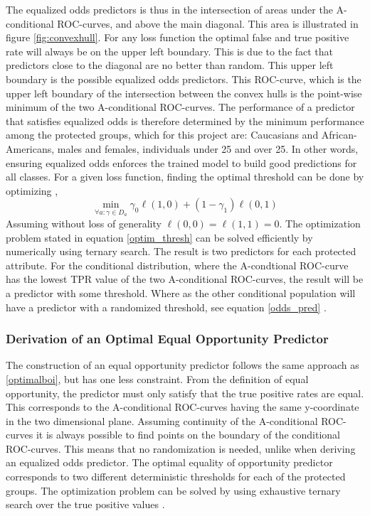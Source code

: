 \documentclass[11pt, fleqn, titlepage]{article}
\begin{document}
	The equalized odds predictors is thus in the intersection of areas under the A-conditional ROC-curves, and above the main diagonal. This area is illustrated in figure \ref{fig:convexhull}. For any loss function the optimal false and true positive rate will always be on the upper left boundary. This is due to the fact that predictors close to the diagonal are no better than random. This upper left boundary is the possible equalized odds predictors. This ROC-curve, which is the upper left boundary of the intersection between the convex hulls is the point-wise minimum of the two A-conditional ROC-curves. The performance of a predictor that satisfies equalized odds is therefore determined by the minimum performance among the protected groups, which for this project are: Caucasians and African-Americans, males and females, individuals under 25 and over 25. In other words, ensuring equalized odds enforces the trained model to build good predictions for all classes. For a given loss function, finding the optimal threshold can be done by optimizing ,
	\begin{equation}\label{optim_thresh}
	\min _{\forall a: \gamma \in D_{a}} \gamma_{0} \ell(1,0)+\left(1-\gamma_{1}\right) \ell(0,1)
	\end{equation}
	Assuming without loss of generality $ \ell (0,0) = \ell(1,1)=0 $.
	The optimization problem stated in equation \ref{optim_thresh} can be solved efficiently by numerically using ternary search. The result is two predictors for each protected attribute. For the conditional distribution, where the A-condtional ROC-curve has the lowest TPR value of the two A-conditional ROC-curves, the result will be a predictor with some threshold. Where as the other conditional population will have a predictor with a randomized threshold, see equation \ref{odds_pred} \cite{equal_of_oppor}.
	\subsubsection{Derivation of an Optimal Equal Opportunity Predictor}\label{optimalboi equal_oppor}
	
	The construction of an equal opportunity predictor follows the same approach as \ref{optimalboi}, but has one less constraint. From the definition of equal opportunity, the predictor must only satisfy that the true positive rates are equal. This corresponds to the A-conditional ROC-curves having the same y-coordinate in the two dimensional plane. Assuming continuity of the A-conditional ROC-curves it is always possible to find points on the boundary of the conditional ROC-curves. This means that no randomization is needed, unlike when deriving an equalized odds predictor. The optimal equality of opportunity predictor corresponds to two different deterministic thresholds for each of the protected groups. The optimization problem can be solved by using exhaustive ternary search over the true positive values \cite{equal_of_oppor}.
	
\end{document}
